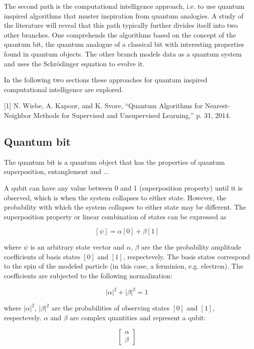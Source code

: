 \documentclass[10pt,a4paper,final]{article}
\begin{document}
The second path is the computational intelligence approach, i.e.  to use quantum inspired algorithms that muster inspiration from quantum analogies. A study of the literature will reveal that this path typically further divides itself into two other branches. One comprehends the algorithms based on the concept of the quantum bit, the quantum analogue of a classical bit with interesting properties found in quantum objects. The other branch models data as a quantum system and uses the Schrödinger equation to evolve it.

In the following two sections these approaches for quantum inspired computational intelligence are explored.

[1] N. Wiebe, A. Kapoor, and K. Svore, “Quantum Algorithms for Nearest-Neighbor Methods for Supervised and Unsupervised Learning,” p. 31, 2014.

\subsection{Quantum bit}

The quantum bit is a quantum object that has the properties of quantum superposition, entanglement and ...


A qubit can have any value between 0 and 1 (superposition property) until it is observed, which is when the system collapses to either state. However, the probability with which the system collapses to either state  may be different. The superposition property or linear combination of states can be expressed as

$$
[\psi] = \alpha[0] + \beta[1]
$$

where $\psi$ is an arbitrary state vector and $\alpha$, $\beta$ are the the probability amplitude coefficients of basis states $[0]$ and $[1]$, respectevely. The basis states correspond to the spin of the modeled particle (in this case, a ferminion, e.g. electron). The coefficients are subjected to the following normalization:

$$|\alpha|^2 + |\beta|^2 = 1$$

where $|\alpha|^2$, $|\beta|^2$ are the probabilities of observing states $[0]$ and $[1]$, respectevely. $\alpha$ and $\beta$ are complex quantities and represent a qubit:

$$\begin{bmatrix}
\alpha \\
\beta
\end{bmatrix}$$
\end{document}
